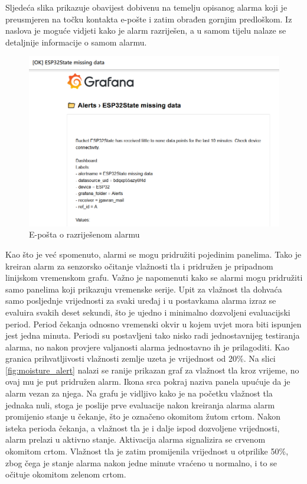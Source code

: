 Sljedeća slika prikazuje obavijest dobivenu na temelju opisanog alarma koji je preusmjeren na točku kontakta e-pošte i zatim obrađen gornjim predloškom. Iz naslova je moguće vidjeti kako je alarm razriješen, a u samom tijelu nalaze se detaljnije informacije o samom alarmu. 

\begin{figure}[ht]
	\centering
	\includegraphics[scale=0.7]{imgs/alert_mail}
	\caption{E-pošta o razriješenom alarmu}
	\label{fig:alert_mail}
\end{figure}

Kao što je već spomenuto, alarmi se mogu pridružiti pojedinim panelima. Tako je kreiran alarm za senzorsko očitanje vlažnosti tla i pridružen je pripadnom linijskom vremenskom grafu. Važno je napomenuti kako se alarmi mogu pridružiti samo panelima koji prikazuju vremenske serije. Upit za vlažnost tla dohvaća samo posljednje vrijednosti za svaki uređaj i u postavkama alarma izraz se evaluira svakih deset sekundi, što je ujedno i minimalno dozvoljeni evaluacijski period. Period čekanja odnosno vremenski okvir u kojem uvjet mora biti ispunjen jest jedna minuta. Periodi su postavljeni tako nisko radi jednostavnijeg testiranja alarma, no nakon provjere valjanosti alarma jednostavno ih je prilagoditi. Kao granica prihvatljivosti vlažnosti zemlje uzeta je vrijednost od 20\%. Na slici \ref{fig:moisture_alert} nalazi se ranije prikazan graf za vlažnost tla kroz vrijeme, no ovaj mu je put pridružen alarm. Ikona srca pokraj naziva panela upućuje da je alarm vezan za njega. Na grafu je vidljivo kako je na početku vlažnost tla jednaka nuli, stoga je poslije prve evaluacije nakon kreiranja alarma alarm promijenio stanje u čekanje, što je označeno okomitom žutom crtom. Nakon isteka perioda čekanja, a vlažnost tla je i dalje ispod dozvoljene vrijednosti, alarm prelazi u aktivno stanje. Aktivacija alarma signalizira se crvenom okomitom crtom. Vlažnost tla je zatim promijenila vrijednost u otprilike 50\%, zbog čega je stanje alarma nakon jedne minute vraćeno u normalno, i to se očituje okomitom zelenom crtom.

